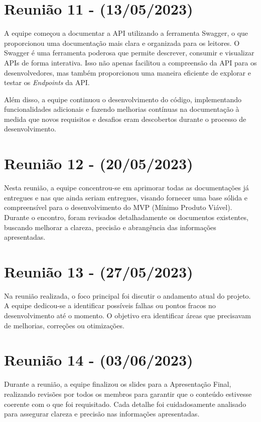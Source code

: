 \begin{apendicesenv}
\section{Reunião 11 - (13/05/2023)}
A equipe começou a documentar a API utilizando a ferramenta Swagger, o que proporcionou uma documentação mais clara e organizada para os leitores. O Swagger é uma ferramenta poderosa que permite descrever, consumir e visualizar APIs de forma interativa. Isso não apenas facilitou a compreensão da API para os desenvolvedores, mas também proporcionou uma maneira eficiente de explorar e testar os \textit{\gls{Endpoints}} da API.

Além disso, a equipe continuou o desenvolvimento do código, implementando funcionalidades adicionais e fazendo melhorias contínuas na documentação à medida que novos requisitos e desafios eram descobertos durante o processo de desenvolvimento.

\section{Reunião 12 - (20/05/2023)}
Nesta reunião, a equipe concentrou-se em aprimorar todas as documentações já entregues e nas que ainda seriam entregues, visando fornecer uma base sólida e compreensível para o desenvolvimento do MVP (Mínimo Produto Viável). Durante o encontro, foram revisados detalhadamente os documentos existentes, buscando melhorar a clareza, precisão e abrangência das informações apresentadas.

\section{Reunião 13 - (27/05/2023)}
Na reunião realizada, o foco principal foi discutir o andamento atual do projeto. A equipe dedicou-se a identificar possíveis falhas ou pontos fracos no desenvolvimento até o momento. O objetivo era identificar áreas que precisavam de melhorias, correções ou otimizações.

\section{Reunião 14 - (03/06/2023)}
Durante a reunião, a equipe finalizou os slides para a Apresentação Final, realizando revisões por todos os membros para garantir que o conteúdo estivesse coerente com o que foi requisitado. Cada detalhe foi cuidadosamente analisado para assegurar clareza e precisão nas informações apresentadas.


\end{apendicesenv}
